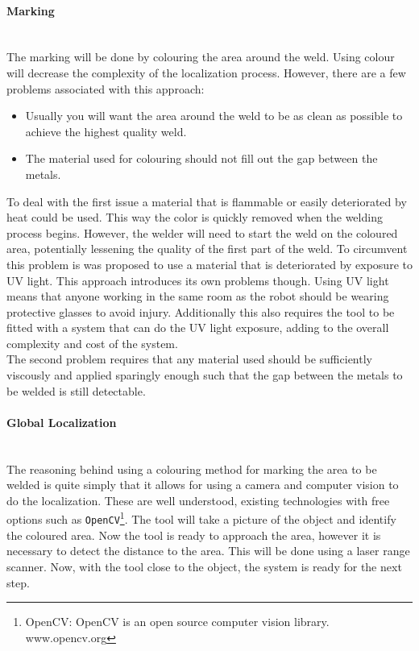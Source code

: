 \documentclass[11pt,a4paper]{article}
\begin{document}
\paragraph{Marking}~~\\
The marking will be done by colouring the area around the weld. Using colour will decrease the complexity of the localization process. However, there are a few problems associated with this approach: 
\begin{itemize}
	\item[] Usually you will want the area around the weld to be as clean as possible to achieve the highest quality weld.
	\item[] The material used for colouring should not fill out the gap between the metals.
\end{itemize}
To deal with the first issue a material that is flammable or easily deteriorated by heat could be used. This way the color is quickly removed when the welding process begins. However, the welder will need to start the weld on the coloured area, potentially lessening the quality of the first part of the weld. To circumvent this problem is was proposed to use a material that is deteriorated by exposure to UV light. This approach introduces its own problems though. Using UV light means that anyone working in the same room as the robot should be wearing protective glasses to avoid injury. Additionally this also requires the tool to be fitted with a system that can do the UV light exposure, adding to the overall complexity and cost of the system.\\
The second problem requires that any material used should be sufficiently viscously and applied sparingly enough such that the gap between the metals to be welded is still detectable.
\paragraph{Global Localization}~~\\
The reasoning behind using a colouring method for marking the area to be welded is quite simply that it allows for using a camera and computer vision to do the localization. These are well understood, existing technologies with free options such as \texttt{OpenCV}\footnote{OpenCV: OpenCV is an open source computer vision library. www.opencv.org}. The tool will take a picture of the object and identify the coloured area. Now the tool is ready to approach the area, however it is necessary to detect the distance to the area. This will be done using a laser range scanner. Now, with the tool close to the object, the system is ready for the next step.
\end{document}
